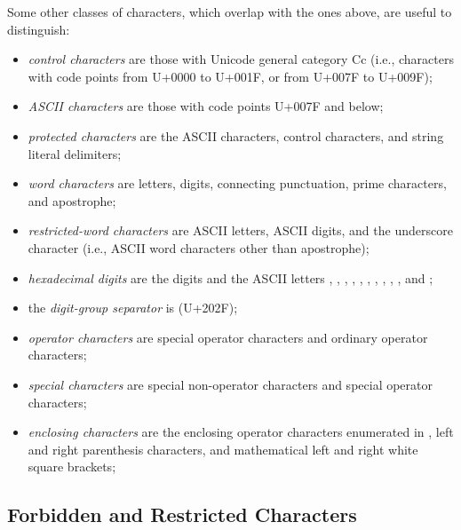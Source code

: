 Some other classes of characters,
which overlap with the ones above,
are useful to distinguish:
\begin{itemize}

\item
\emph{control characters} are those with Unicode general category Cc
(i.e., characters with code points from U+0000 to U+001F,
or from U+007F to U+009F);

\item
\emph{ASCII characters} are those with code points U+007F and below;

\item
\emph{protected characters}
are the ASCII characters,
control characters,
and string literal delimiters;

\item
\emph{word characters}
are letters, digits, connecting punctuation, prime characters,
and apostrophe;

\item
\emph{restricted-word characters}
are ASCII letters, ASCII digits, and the underscore character
(i.e., ASCII word characters other than apostrophe);

\item
\emph{hexadecimal digits}
are the digits
and the ASCII letters , , , , , ,
, , , ,  and ;

\item
the \emph{digit-group separator} is
 (U+202F);

\item
\emph{operator characters}
are special operator characters
and ordinary operator characters;

\item
\emph{special characters}
are special non-operator characters
and special operator characters;

\item
\emph{enclosing characters}
are the enclosing operator characters
enumerated in ,
left and right parenthesis characters,
and mathematical left and right white square brackets;

\end{itemize}


\subsection*{Forbidden and Restricted Characters}

